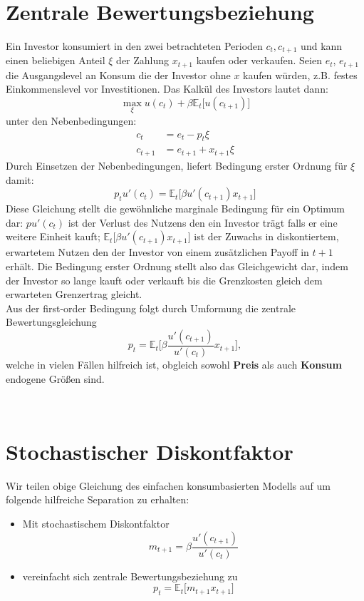 \documentclass[12pt]{extreport} %
\theoremstyle{named}
\theoremstyle{nnamed}
\theoremstyle{itshape}
\theoremstyle{normal}
\begin{document}
~\newpage

\section{Zentrale Bewertungsbeziehung}

Ein Investor konsumiert in den zwei betrachteten Perioden $c_t, c_{t+1}$ und kann einen beliebigen Anteil $\xi$ der Zahlung $x_{t+1}$ kaufen oder verkaufen. Seien $e_t$, $e_{t+1}$ die Ausgangslevel an Konsum die der Investor ohne $x$ kaufen würden, z.B. festes Einkommenslevel vor Investitionen. Das Kalkül des Investors lautet dann:
		$$ \max_{\xi} u(c_t) + \beta \mathbb{E}_t \big[ u(c_{t+1}) \big] $$
	unter den Nebenbedingungen: 
		\begin{align*}
			c_{t} & = e_t - p_t \xi \\
			c_{t+1} & = e_{t+1} + x_{t+1} \xi
		\end{align*}
Durch Einsetzen der Nebenbedingungen, liefert Bedingung erster Ordnung für $\xi$ damit:
	$$ p_t u'(c_t) = \mathbb{E}_t \big[ \beta u'(c_{t+1}) x_{t+1} \big] $$
Diese Gleichung stellt die gewöhnliche marginale Bedingung für ein Optimum dar: $p u'(c_t)$ ist der Verlust des Nutzens den ein Investor trägt falls er eine weitere Einheit kauft; $\mathbb{E}_t \big[ \beta u'(c_{t+1}) x_{t+1} \big]$ ist der Zuwachs in diskontiertem, erwartetem Nutzen den der Investor von einem zusätzlichen Payoff in $t+1$ erhält. Die Bedingung erster Ordnung stellt also das Gleichgewicht dar, indem der Investor so lange kauft oder verkauft bis die Grenzkosten  gleich dem erwarteten Grenzertrag gleicht. ~\\

Aus der first-order Bedingung folgt durch Umformung die zentrale Bewertungsgleichung
	$$ p_t = \mathbb{E}_t \big[ \beta \frac{u'(c_{t+1})}{u'(c_t)} x_{t+1} \big], $$
welche in vielen Fällen hilfreich ist, obgleich sowohl \textbf{Preis} als auch \textbf{Konsum} endogene Größen sind. 

~\newpage

\section{Stochastischer Diskontfaktor}

Wir teilen obige Gleichung des einfachen konsumbasierten Modells auf um folgende hilfreiche Separation zu erhalten:

\begin{itemize}
	\item Mit stochastischem Diskontfaktor
	 $$ m_{t+1} = \beta \frac{u'(c_{t+1})}{u'(c_t)} $$
	\item vereinfacht sich zentrale Bewertungsbeziehung zu
	 $$ p_t = \mathbb{E}_t \big[ m_{t+1} x_{t+1} \big] $$
\end{itemize}
\end{document}
